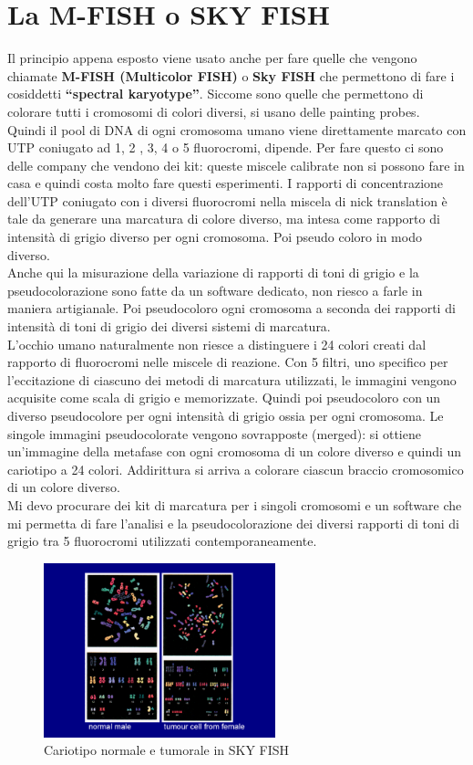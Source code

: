 \documentclass[11pt]{book}
\begin{document}
\section{La M-FISH o SKY FISH}
Il principio appena esposto viene usato anche per fare quelle che vengono chiamate \textbf{M-FISH (Multicolor FISH)} o \textbf{Sky FISH} che permettono di fare i cosiddetti \textbf{``spectral karyotype''}. Siccome sono quelle che permettono di colorare tutti i cromosomi di colori diversi, si usano delle painting probes.\\
Quindi il pool di DNA di ogni cromosoma umano viene direttamente marcato con UTP coniugato ad 1, 2 , 3, 4 o 5 fluorocromi, dipende. Per fare questo ci sono delle company che vendono dei kit: queste miscele calibrate non si possono fare in casa e quindi costa molto fare questi esperimenti. I rapporti di concentrazione dell’UTP coniugato con i diversi fluorocromi nella miscela di nick translation è tale da generare una marcatura di colore diverso, ma intesa come rapporto di intensità di grigio diverso per ogni cromosoma. Poi pseudo coloro in modo diverso.\\
Anche qui la misurazione della variazione di rapporti di toni di grigio e la pseudocolorazione sono fatte da un software dedicato, non riesco a farle in maniera artigianale. Poi pseudocoloro ogni cromosoma a seconda dei rapporti di intensità di toni di grigio dei diversi sistemi di marcatura.\\
L’occhio umano naturalmente non riesce a distinguere i 24 colori creati dal rapporto di fluorocromi nelle miscele di reazione. Con 5 filtri, uno specifico per l’eccitazione di ciascuno dei metodi di marcatura utilizzati, le immagini vengono acquisite come scala di grigio e memorizzate. Quindi poi pseudocoloro con un diverso pseudocolore per ogni intensità di grigio ossia per ogni cromosoma. Le singole immagini pseudocolorate vengono sovrapposte (merged): si ottiene un’immagine della metafase con ogni cromosoma di un colore diverso e quindi un cariotipo a 24 colori. Addirittura si arriva a colorare ciascun braccio cromosomico di un colore diverso.\\
Mi devo procurare dei kit di marcatura per i singoli cromosomi e un software che mi permetta di fare l’analisi e la pseudocolorazione dei diversi rapporti di toni di grigio tra 5 fluorocromi utilizzati contemporaneamente.

\begin{figure}
    \includegraphics[width=0.6\textwidth]{img/41_cariotipo_fish.png}
  \caption{Cariotipo normale e tumorale in SKY FISH}
\end{figure}
\end{document}
